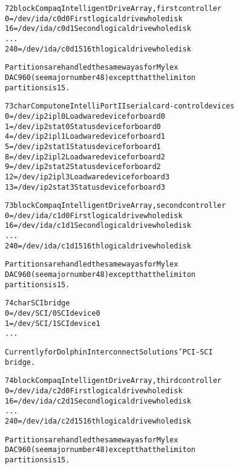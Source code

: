 \documentclass[a4paper,8pt,english]{sphinxmanual}
\begin{document}
\begin{alltt}
  72 block      Compaq Intelligent Drive Array, first controller
                  0 = /dev/ida/c0d0     First logical drive whole disk
                 16 = /dev/ida/c0d1     Second logical drive whole disk
                    ...
                240 = /dev/ida/c0d15    16th logical drive whole disk

                Partitions are handled the same way as for Mylex
                DAC960 (see major number 48) except that the limit on
                partitions is 15.

  73 char       Computone IntelliPort II serial card - control devices
                  0 = /dev/ip2ipl0      Loadware device for board 0
                  1 = /dev/ip2stat0     Status device for board 0
                  4 = /dev/ip2ipl1      Loadware device for board 1
                  5 = /dev/ip2stat1     Status device for board 1
                  8 = /dev/ip2ipl2      Loadware device for board 2
                  9 = /dev/ip2stat2     Status device for board 2
                 12 = /dev/ip2ipl3      Loadware device for board 3
                 13 = /dev/ip2stat3     Status device for board 3

  73 block      Compaq Intelligent Drive Array, second controller
                  0 = /dev/ida/c1d0     First logical drive whole disk
                 16 = /dev/ida/c1d1     Second logical drive whole disk
                    ...
                240 = /dev/ida/c1d15    16th logical drive whole disk

                Partitions are handled the same way as for Mylex
                DAC960 (see major number 48) except that the limit on
                partitions is 15.

  74 char       SCI bridge
                  0 = /dev/SCI/0        SCI device 0
                  1 = /dev/SCI/1        SCI device 1
                    ...

                Currently for Dolphin Interconnect Solutions' PCI-SCI
                bridge.

  74 block      Compaq Intelligent Drive Array, third controller
                  0 = /dev/ida/c2d0     First logical drive whole disk
                 16 = /dev/ida/c2d1     Second logical drive whole disk
                    ...
                240 = /dev/ida/c2d15    16th logical drive whole disk

                Partitions are handled the same way as for Mylex
                DAC960 (see major number 48) except that the limit on
                partitions is 15.


\end{alltt}
\end{document}
